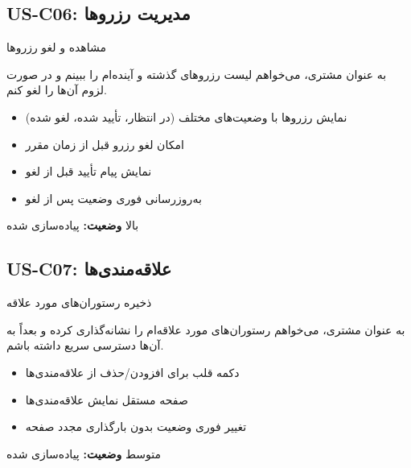 \documentclass[12pt, a4paper]{article}
\begin{document}
\subsection{US-C06: مدیریت رزروها}
\begin{description}[rightmargin=0.5cm]
  \item[عنوان:] مشاهده و لغو رزروها
  \item[داستان:] به عنوان مشتری، می‌خواهم لیست رزروهای گذشته و آینده‌ام را ببینم و در
  صورت لزوم آن‌ها را لغو کنم.
  \item[معیارهای پذیرش:]
  \begin{itemize}[rightmargin=0.5cm]
    \item نمایش رزروها با وضعیت‌های مختلف (در انتظار، تأیید شده، لغو شده)
    \item امکان لغو رزرو قبل از زمان مقرر
    \item نمایش پیام تأیید قبل از لغو
    \item به‌روزرسانی فوری وضعیت پس از لغو
  \end{itemize}
  \item[اولویت:] بالا \quad \textbf{وضعیت:} پیاده‌سازی شده
\end{description}

\subsection{US-C07: علاقه‌مندی‌ها}
\begin{description}[rightmargin=0.5cm]
  \item[عنوان:] ذخیره رستوران‌های مورد علاقه
  \item[داستان:] به عنوان مشتری، می‌خواهم رستوران‌های مورد علاقه‌ام را نشانه‌گذاری کرده
  و بعداً به آن‌ها دسترسی سریع داشته باشم.
  \item[معیارهای پذیرش:]
  \begin{itemize}[rightmargin=0.5cm]
    \item دکمه قلب برای افزودن/حذف از علاقه‌مندی‌ها
    \item صفحه مستقل نمایش علاقه‌مندی‌ها
    \item تغییر فوری وضعیت بدون بارگذاری مجدد صفحه
  \end{itemize}
  \item[اولویت:] متوسط \quad \textbf{وضعیت:} پیاده‌سازی شده
\end{description}
\end{document}
